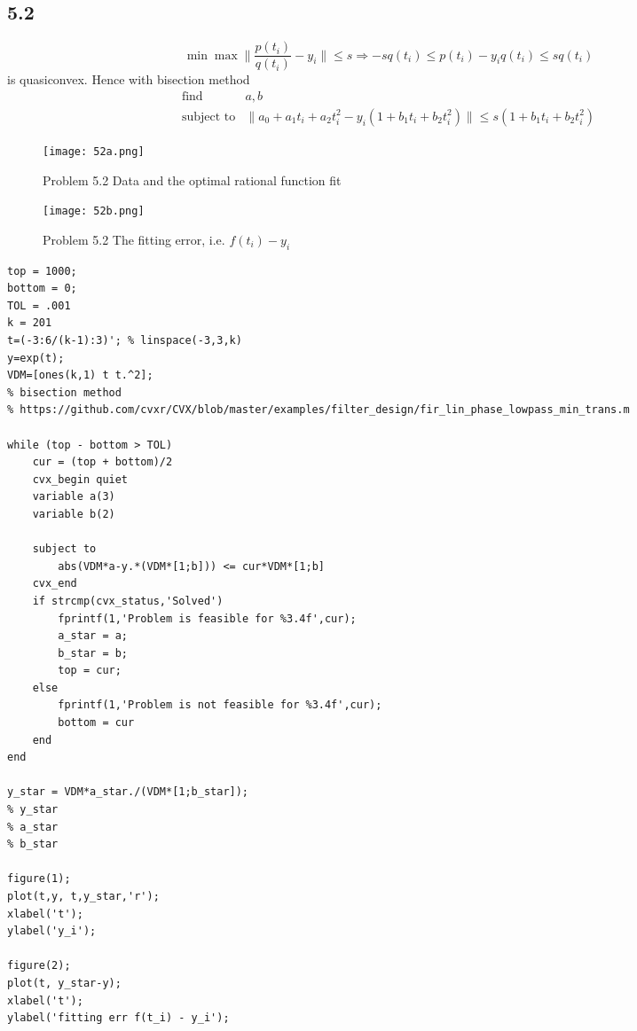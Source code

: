 \documentclass{article}
\begin{document}
\subsection*{5.2}
\[\min \max \|\dfrac{p(t_i)}{q(t_i)} - y_i\| \le s \Rightarrow -sq(t_i) \le p(t_i) - y_iq(t_i) \le sq(t_i)\]
 is quasiconvex. Hence with bisection method 
  \[  \boxed{  \begin{array}{ll}
    \mbox{find}   &  a, b \\
    \mbox{subject to} &  \| a_0 + a_1 t_i + a_2 t_i^2 - y_i (1 + b_1 t_i + b_2 t_i^2) \| \le s(1 + b_1 t_i + b_2 t_i^2) 
    
            \end{array} 
         }
  \]    

   \begin{figure}[h]
\centering
\begin{minipage}{.5\textwidth}
  \centering
  \texttt{[image: 52a.png]}
  \caption{Problem 5.2 Data and the optimal rational function fit}

\end{minipage}%
\begin{minipage}{.5\textwidth}
  \centering
  \texttt{[image: 52b.png]}
  \caption{Problem 5.2 The fitting error, i.e. $f(t_i) - y_i$}

\end{minipage}
\end{figure}
\begin{verbatim}
top = 1000;
bottom = 0;
TOL = .001
k = 201
t=(-3:6/(k-1):3)'; % linspace(-3,3,k)
y=exp(t);
VDM=[ones(k,1) t t.^2];
% bisection method 
% https://github.com/cvxr/CVX/blob/master/examples/filter_design/fir_lin_phase_lowpass_min_trans.m

while (top - bottom > TOL)
    cur = (top + bottom)/2
    cvx_begin quiet
    variable a(3)
    variable b(2)
    
    subject to
        abs(VDM*a-y.*(VDM*[1;b])) <= cur*VDM*[1;b]
    cvx_end
    if strcmp(cvx_status,'Solved')
        fprintf(1,'Problem is feasible for %3.4f',cur);
        a_star = a;
        b_star = b;
        top = cur;
    else
        fprintf(1,'Problem is not feasible for %3.4f',cur);
        bottom = cur       
    end
end

y_star = VDM*a_star./(VDM*[1;b_star]);
% y_star
% a_star
% b_star

figure(1);
plot(t,y, t,y_star,'r');
xlabel('t');
ylabel('y_i');

figure(2);
plot(t, y_star-y);
xlabel('t');
ylabel('fitting err f(t_i) - y_i');
\end{verbatim}
\end{document}
